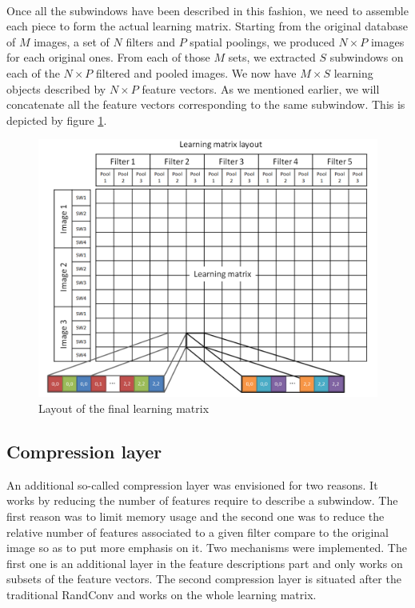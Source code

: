\documentclass[a4paper]{report}
\begin{document}
	\paragraph{}
	Once all the subwindows have been described in this fashion, we need to assemble each piece to form the actual learning matrix.
	Starting from the original database of $M$ images, a set of $N$ filters and $P$ spatial poolings, we produced $N \times P$ images for each original ones. From each of those $M$ sets, we extracted $S$ subwindows on each of the $N \times P$ filtered and pooled images. We now have $M \times S$ learning objects described by $N \times P$ feature vectors. As we mentioned earlier, we will concatenate all the feature vectors corresponding to the same subwindow. This is depicted by figure \ref{fig:LearningMatrix}.
	
	\begin{figure}
		\centering
			\includegraphics[width=1.0\textwidth]{images/LearningMatrix.png}
		\caption{\label{fig:LearningMatrix}Layout of the final learning matrix}
	\end{figure}	
		
		\subsection{Compression layer}
		An additional so-called compression layer was envisioned for two reasons. It works by reducing the number of features require to describe a subwindow. The first reason was to limit memory usage and the second one was to reduce the relative number of features associated to a given filter compare to the original image so as to put more emphasis on it.
		Two mechanisms were implemented. The first one is an additional layer in the feature descriptions part and only works on subsets of the  feature vectors. The second compression layer is situated after the traditional RandConv and works on the whole learning matrix.
		
\end{document}
